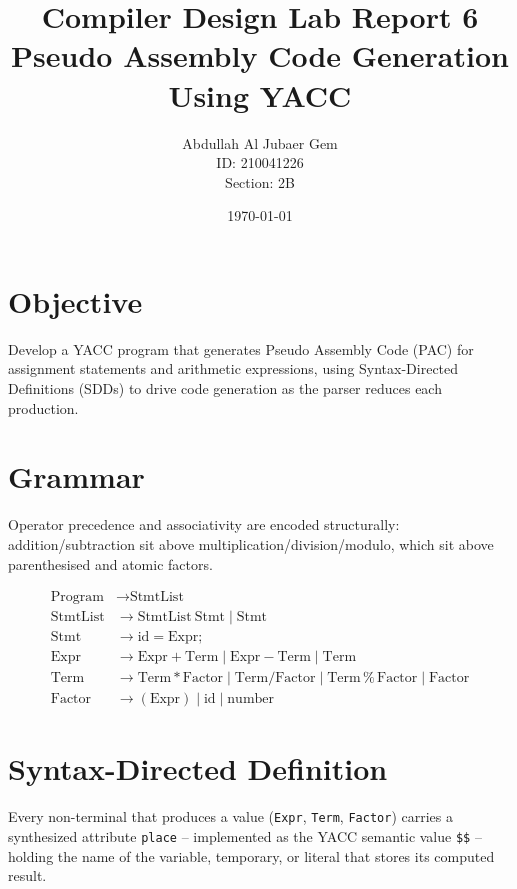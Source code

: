 \documentclass{article}
\title{Compiler Design Lab Report 6\\Pseudo Assembly Code Generation Using YACC}
\author{Abdullah Al Jubaer Gem\\ID: 210041226\\Section: 2B}
\date{\today}
\begin{document}
\maketitle

\section{Objective}
Develop a YACC program that generates Pseudo Assembly Code (PAC) for assignment statements and arithmetic expressions, using Syntax-Directed Definitions (SDDs) to drive code generation as the parser reduces each production.

\section{Grammar}
Operator precedence and associativity are encoded structurally: addition/subtraction sit above multiplication/division/modulo, which sit above parenthesised and atomic factors.

\begin{align*}
\text{Program}  &\rightarrow \text{StmtList} \\
\text{StmtList} &\rightarrow \text{StmtList}\ \text{Stmt} \mid \text{Stmt} \\
\text{Stmt}     &\rightarrow \text{id} = \text{Expr} ; \\
\text{Expr}     &\rightarrow \text{Expr} + \text{Term} \mid \text{Expr} - \text{Term} \mid \text{Term} \\
\text{Term}     &\rightarrow \text{Term} * \text{Factor} \mid \text{Term} / \text{Factor} \mid \text{Term} \mathbin{\%} \text{Factor} \mid \text{Factor} \\
\text{Factor}   &\rightarrow ( \text{Expr} ) \mid \text{id} \mid \text{number}
\end{align*}

\section{Syntax-Directed Definition}
Every non-terminal that produces a value (\texttt{Expr}, \texttt{Term}, \texttt{Factor}) carries a synthesized attribute \texttt{place} -- implemented as the YACC semantic value \texttt{\$\$} -- holding the name of the variable, temporary, or literal that stores its computed result.
\end{document}
